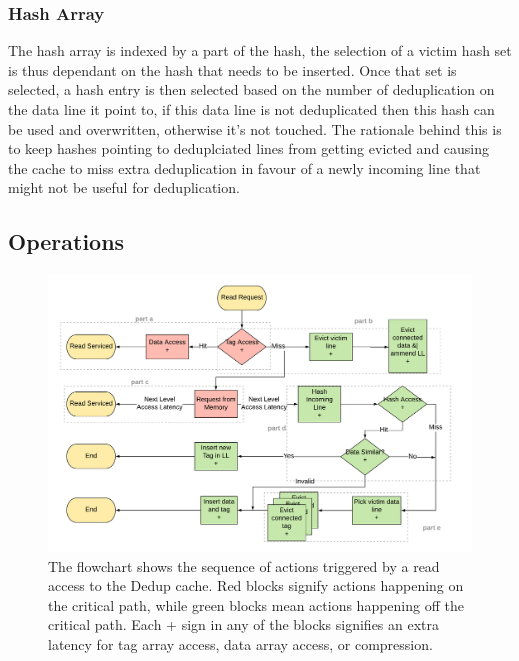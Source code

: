 \subsubsection{Hash Array}
\label{sssec:DedupHashRepl}
The hash array is indexed by a part of the hash, the selection of a victim hash set is thus dependant on the hash that needs to be inserted. Once that set is selected, a hash entry is then selected based on the number of deduplication on the data line it point to, if this data line is not deduplicated then this hash can be used and overwritten, otherwise it's not touched. The rationale behind this is to keep hashes pointing to deduplciated lines from getting evicted and causing the cache to miss extra deduplication in favour of a newly incoming line that might not be useful for deduplication.\par

\subsection{Operations}
\label{ssec:DedupOperations}
\begin{figure}[h]
    \includegraphics[width=\textwidth]{Dedup_Read.pdf}
    \caption[Dedup Read]{The flowchart shows the sequence of actions triggered by a read access to the Dedup cache. Red blocks signify actions happening on the critical path, while green blocks mean actions happening off the critical path. Each + sign in any of the blocks signifies an extra latency for tag array access, data array access, or compression.}
    \label{fig:Dedup_Read}
\end{figure}
